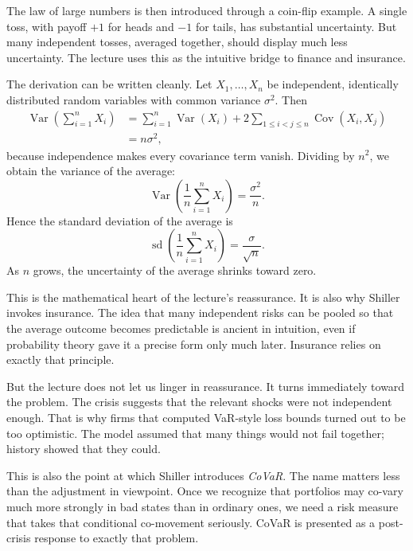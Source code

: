 The law of large numbers is then introduced through a coin-flip example. A single toss, with payoff \(+1\) for heads and \(-1\) for tails, has substantial uncertainty. But many independent tosses, averaged together, should display much less uncertainty. The lecture uses this as the intuitive bridge to finance and insurance.

The derivation can be written cleanly. Let \(X_1,\dots,X_n\) be independent, identically distributed random variables with common variance \(\sigma^2\). Then
\begin{align}
\operatorname{Var}\!\left(\sum_{i=1}^{n}X_i\right)
&=
\sum_{i=1}^{n}\operatorname{Var}(X_i)
+
2\sum_{1\le i<j\le n}\operatorname{Cov}(X_i,X_j) \\
&= n\sigma^2,
\end{align}
because independence makes every covariance term vanish. Dividing by \(n^2\), we obtain the variance of the average:
\begin{equation}
\operatorname{Var}\!\left(\frac{1}{n}\sum_{i=1}^{n}X_i\right)=\frac{\sigma^2}{n}.
\end{equation}
Hence the standard deviation of the average is
\begin{equation}
\operatorname{sd}\!\left(\frac{1}{n}\sum_{i=1}^{n}X_i\right)=\frac{\sigma}{\sqrt{n}}.
\end{equation}
As \(n\) grows, the uncertainty of the average shrinks toward zero.

This is the mathematical heart of the lecture's reassurance. It is also why Shiller invokes insurance. The idea that many independent risks can be pooled so that the average outcome becomes predictable is ancient in intuition, even if probability theory gave it a precise form only much later. Insurance relies on exactly that principle.

But the lecture does not let us linger in reassurance. It turns immediately toward the problem. The crisis suggests that the relevant shocks were not independent enough. That is why firms that computed VaR-style loss bounds turned out to be too optimistic. The model assumed that many things would not fail together; history showed that they could.

This is also the point at which Shiller introduces \emph{CoVaR}. The name matters less than the adjustment in viewpoint. Once we recognize that portfolios may co-vary much more strongly in bad states than in ordinary ones, we need a risk measure that takes that conditional co-movement seriously. CoVaR is presented as a post-crisis response to exactly that problem.

